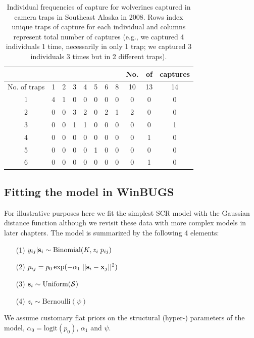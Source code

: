 {\begin{table} [htp]
  \caption{Individual frequencies of capture for wolverines captured
    in camera traps in Southeast Alaska in 2008. Rows index unique
    traps of capture for each individual 
and columns represent total number of captures
    (e.g., we captured 4 individuals 1 time, necessarily in only 1
    trap; we captured 3 individuals 3 times but in 2 different traps).
}
\centering
\begin{tabular}{c c c c c c c c c c c}
\hline
 & & & & & & & &  No.&of&captures \\
\hline
No. of traps & 1 & 2 & 3 & 4 & 5 & 6 & 8 & 10 &13 &14 \\
\hline
1 & 4 & 1 & 0 & 0 & 0 & 0 & 0 & 0 & 0 & 0 \\
2 & 0 & 0 & 3 & 2 & 0 & 2 & 1 & 2 & 0 & 0 \\
3 & 0 & 0 & 1 & 1 & 0 & 0 & 0 & 0 & 0 & 1 \\
4 & 0 & 0 & 0 & 0 & 0 & 0 & 0 & 0 & 1 & 0 \\
5 & 0 & 0 & 0 & 0 & 1 & 0 & 0 & 0 & 0 & 0 \\
6 & 0 & 0 & 0 & 0 & 0 & 0 & 0 & 0 & 1 & 0 \\
\hline
\end{tabular}
\label{scr0.tab.wolverine}
\end{table}


\subsection{Fitting the model in WinBUGS}

For illustrative purposes here we fit the simplest SCR model with the
Gaussian distance function although we revisit these data with more
complex models in later chapters. The model is summarized by the
following 4 elements:
\begin{itemize}
\item[(1)] $y_{ij}|{\bf s}_{i} \sim \mbox{Binomial}(K, z_{i}\; p_{ij})$
\item[(2)] $p_{ij} = p_{0} \exp(-\alpha_{1} \; ||{\bf s}_{i}-{\bf x}_{j}||^2)$
\item[(3)] ${\bf s}_{i} \sim \mbox{Uniform}({\cal S})$
\item[(4)] $z_{i} \sim \mbox{Bernoulli}(\psi)$
\end{itemize}
We assume customary flat priors on the structural (hyper-) parameters
of the model, $\alpha_{0} = \mbox{logit}(p_{0})$, $\alpha_{1}$ and
$\psi$.  

}
